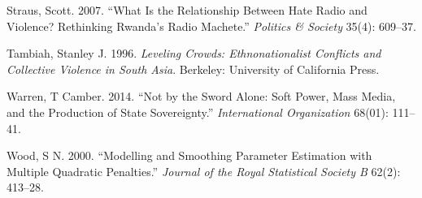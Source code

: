\documentclass[11pt,article,oneside]{memoir}
\begin{document}
Straus, Scott. 2007. ``What Is the Relationship Between Hate Radio and
Violence? Rethinking Rwanda's Radio Machete.'' \emph{Politics \&
Society} 35(4): 609--37.

Tambiah, Stanley J. 1996. \emph{Leveling Crowds: Ethnonationalist
Conflicts and Collective Violence in South Asia}. Berkeley: University
of California Press.

Warren, T Camber. 2014. ``Not by the Sword Alone: Soft Power, Mass
Media, and the Production of State Sovereignty.'' \emph{International
Organization} 68(01): 111--41.

Wood, S N. 2000. ``Modelling and Smoothing Parameter Estimation with
Multiple Quadratic Penalties.'' \emph{Journal of the Royal Statistical
Society B} 62(2): 413--28.
\end{document}
